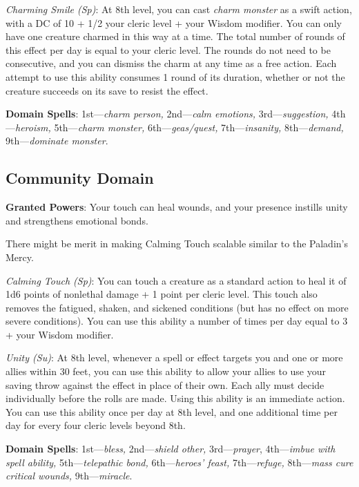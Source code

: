 \textit{Charming Smile (Sp)}: At 8th level, you can cast \textit{charm monster} as a swift action, with a DC of 
    10 + 1/2 your cleric level + your Wisdom modifier. You can only have one creature charmed in this way at a
    time. The total number of rounds of this effect per day is equal to your cleric level. The rounds do not
    need to be consecutive, and you can dismiss the charm at any time as a free action. Each attempt to use 
    this ability consumes 1 round of its duration, whether or not the creature succeeds on its save to resist
    the effect.
				
\textbf{Domain Spells}: 1st---\textit{charm person, }2nd---\textit{calm emotions, }3rd---\textit{suggestion, }
   4th---\textit{heroism, }5th---\textit{charm monster, }6th---\textit{geas/quest, }7th---\textit{insanity, }
   8th---\textit{demand, }9th---\textit{dominate monster}. 
				
\subsection{Community Domain}


\textbf{Granted Powers}: Your touch can heal wounds, and your presence instills unity and strengthens emotional 
    bonds.

\begin{formal}
 There might be merit in making Calming Touch scalable similar to the Paladin's Mercy.
\end{formal}

\textit{Calming Touch (Sp)}: You can touch a creature as a standard action to heal it of 1d6 points of nonlethal
    damage + 1 point per cleric level. This touch also removes the fatigued, shaken, and sickened conditions (but
    has no effect on more severe conditions). You can use this ability a number of times per day equal to 3 + your
    Wisdom modifier.
				
\textit{Unity (Su)}: At 8th level, whenever a spell or effect targets you and one or more allies within 30 feet,
    you can use this ability to allow your allies to use your saving throw against the effect in place of their
    own. Each ally must decide individually before the rolls are made. Using this ability is an immediate action.
    You can use this ability once per day at 8th level, and one additional time per day for every four cleric
    levels beyond 8th.

\textbf{Domain Spells}: 1st---\textit{bless, }2nd---\textit{shield other, }3rd---\textit{prayer}, 4th---\textit{imbue with spell ability, }5th---\textit{telepathic bond, }6th---\textit{heroes' feast, }7th---\textit{refuge, }8th---\textit{mass cure critical wounds, }9th---\textit{miracle}.

